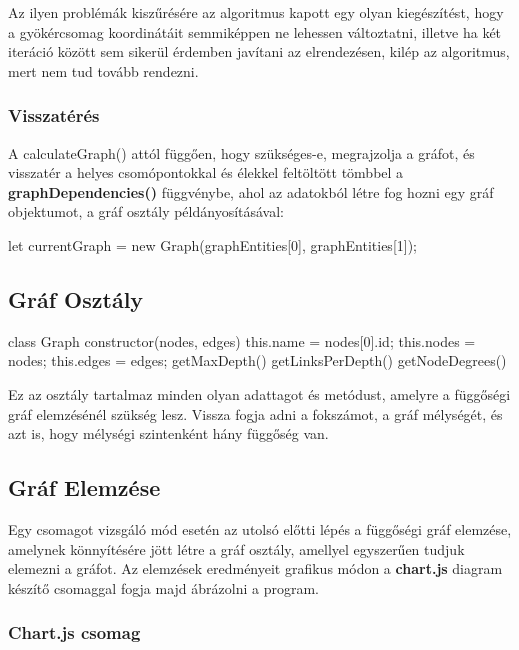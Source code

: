 Az ilyen problémák kiszűrésére az algoritmus kapott egy olyan kiegészítést, hogy a gyökércsomag koordinátáit semmiképpen ne lehessen változtatni, illetve ha két iteráció között sem sikerül érdemben javítani az elrendezésen, kilép az algoritmus, mert nem tud tovább rendezni.\\

\subsubsection{Visszatérés}

A calculateGraph() attól függően, hogy szükséges-e, megrajzolja a gráfot, és visszatér a helyes csomópontokkal és élekkel feltöltött tömbbel a \textbf{graphDependencies()} függvénybe, ahol az adatokból létre fog hozni egy gráf objektumot, a gráf osztály példányosításával:

\begin{cpp}
let currentGraph = new Graph(graphEntities[0], graphEntities[1]);
\end{cpp}

\pagebreak

\subsection{Gráf Osztály}

\begin{cpp}
class Graph{
	constructor(nodes, edges){
		this.name = nodes[0].id;
		this.nodes = nodes;
		this.edges = edges;
	}
	getMaxDepth(){
	}
	getLinksPerDepth(){
	}
	getNodeDegrees(){
	}	
}
\end{cpp}

Ez az osztály tartalmaz minden olyan adattagot és metódust, amelyre a függőségi gráf elemzésénél szükség lesz. Vissza fogja adni a fokszámot, a gráf mélységét, és azt is, hogy mélységi szintenként hány függőség van.

\subsection{Gráf Elemzése}

Egy csomagot vizsgáló mód esetén az utolsó előtti lépés a függőségi gráf elemzése, amelynek könnyítésére jött létre a gráf osztály, amellyel egyszerűen tudjuk elemezni a gráfot. Az elemzések eredményeit grafikus módon a \textbf{chart.js} diagram készítő csomaggal fogja majd ábrázolni a program.

\subsubsection{Chart.js csomag}

